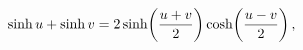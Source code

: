 \[\mathop{\sinh\/}\nolimits u+\mathop{\sinh\/}\nolimits v=2\mathop{\sinh\/}%
\nolimits\!\left(\frac{u+v}{2}\right)\mathop{\cosh\/}\nolimits\!\left(\frac{u-%
v}{2}\right),\]